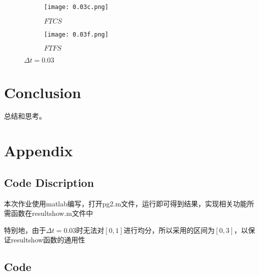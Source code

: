 \documentclass{article}
\begin{document}
\begin{figure}[H]
    \centering
    \begin{subfigure}[b]{0.47\textwidth}
        \centering
        \texttt{[image: 0.03c.png]}
        \caption{$FTCS$}
        
    \end{subfigure}
    \begin{subfigure}[b]{0.47\textwidth}
        \centering
        \texttt{[image: 0.03f.png]}
        \caption{$FTFS$}
        
    \end{subfigure}
    \caption{$\Delta t=0.03$}
\end{figure}
\section{Conclusion}

总结和思考。

\section{Appendix}
\subsection{Code Discription}

本次作业使用matlab编写，打开pg2.m文件，运行即可得到结果，实现相关功能所需函数在resultshow.m文件中

特别地，由于$\Delta t=0.03$时无法对$[0,1]$进行均分，所以采用的区间为$[0,3]$，以保证resultshow函数的通用性

\subsection{Code}


\end{document}
